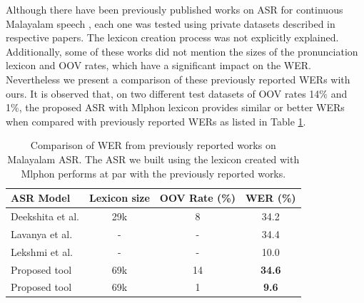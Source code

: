 \documentclass{ieeeaccess}
\begin{document}
Although there have been previously published works on ASR for continuous Malayalam speech \cite{lavanya2018,deekshitha,lekshmi2021}, each one was tested using private datasets described in respective papers. The lexicon creation process was not explicitly explained. Additionally, some of these works did not mention the sizes of the pronunciation lexicon and OOV rates, which have a significant impact on the WER. Nevertheless we present a comparison of these previously reported WERs with ours. It is observed that, on two different test datasets of OOV rates 14\% and 1\%, the proposed ASR with Mlphon lexicon provides similar or better WERs when compared with previously reported WERs as listed in Table \ref{asrcomparison}. 

\begin{table}[h]
	\caption{Comparison of WER from previously reported works on  Malayalam ASR. The ASR we built using the lexicon created with Mlphon performs at par with the previously reported works.}
	\label{asrcomparison}
	\begin{tabular}{lcc|c}
 \hline \hline
 \textbf{ASR Model} & \textbf{Lexicon size} & \textbf{OOV Rate (\%)}& \textbf{WER (\%)} \\
 \hline
 Deekshita et al.\cite{deekshitha} & 29k & 8 & 34.2 \\
 Lavanya et al. \cite{lavanya2018} & - & - & 34.4 \\
Lekshmi et al. \cite{lekshmi2021} & - & - & 10.0 \\
Proposed tool & 69k & 14& \textbf{34.6} \\
Proposed tool & 69k & 1& \textbf{9.6}\\

\hline	\end{tabular}
\end{table}
\end{document}

